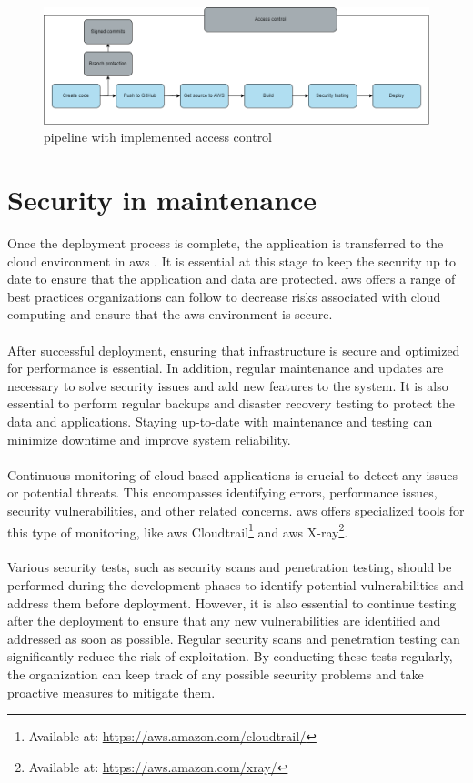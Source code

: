 \vspace{2mm}
\begin{figure}[H]
    \centering
    \includegraphics[width=0.8\columnwidth]{Images/accesscontrol.png}
    \caption{\gls{pipeline} with implemented access control}
    \label{fig: Pipeline with implemented access control}
\end{figure}

 
\section{Security in maintenance}
Once the deployment process is complete, the application is transferred to the cloud environment in \acrlong{aws} \cite{awsafterdep}. It is essential at this stage to keep the security up to date to ensure that the application and data are protected. \acrshort{aws} offers a range of best practices organizations can follow to decrease risks associated with cloud computing and ensure that the  \acrshort{aws} environment is secure.
\\~\\
After successful deployment, ensuring that infrastructure is secure and optimized for performance is essential. In addition, regular maintenance and updates are necessary to solve security issues and add new features to the system. It is also essential to perform regular backups and disaster recovery testing to protect the data and applications. Staying up-to-date with maintenance and testing can minimize downtime and improve system reliability. 
\\~\\
Continuous monitoring of cloud-based applications is crucial to detect any issues or potential threats. This encompasses identifying errors, performance issues, security vulnerabilities, and other related concerns. \acrshort{aws} offers specialized tools for this type of monitoring, like \acrshort{aws} Cloudtrail\footnote{Available at: \url{https://aws.amazon.com/cloudtrail/}} and \acrshort{aws} X-ray\footnote{Available at: \url{https://aws.amazon.com/xray/}}. 
\\~\\
Various security tests, such as security scans and penetration testing, should be performed during the development phases to identify potential vulnerabilities and address them before deployment. However, it is also essential to continue testing after the deployment to ensure that any new vulnerabilities are identified and addressed as soon as possible. Regular security scans and penetration testing can significantly reduce the risk of exploitation. By conducting these tests regularly, the organization can keep track of any possible security problems and take proactive measures to mitigate them.
